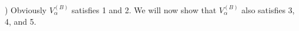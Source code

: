 ) Obviously $V_{\alpha}^{(B)}$ satisfies 1 and 2. We will now show that $V_{\alpha}^{(B)}$ also satisfies 3, 4, and 5.
